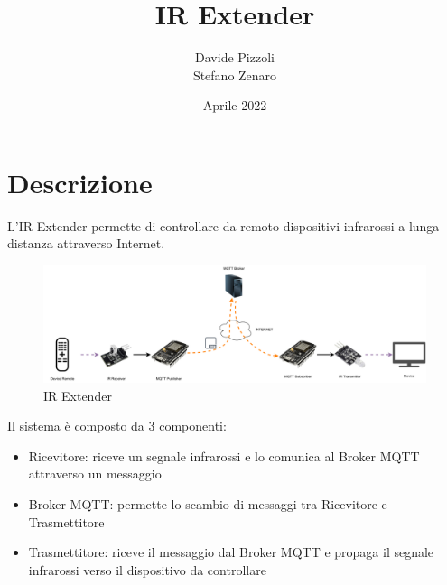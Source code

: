 \documentclass[a4paper,11pt]{article}
\begin{document}
\title{IR Extender}
\author{Davide Pizzoli \\ Stefano Zenaro}
\date{Aprile 2022}


\begin{titlepage}
  \maketitle
  \thispagestyle{empty}
\end{titlepage}

\tableofcontents
{}
\clearpage


\section{Descrizione}

    L'IR Extender permette di controllare da remoto dispositivi infrarossi a lunga distanza attraverso Internet.

    \begin{figure}[H]
      \centering
      \includegraphics[width=\textwidth,height=\textheight,keepaspectratio]{assets/ir_extender}
      \caption{IR Extender}
    \end{figure}

    Il sistema è composto da 3 componenti:
    \begin{itemize}
      \item Ricevitore: riceve un segnale infrarossi e lo comunica al Broker MQTT attraverso un messaggio
      \item Broker MQTT: permette lo scambio di messaggi tra Ricevitore e Trasmettitore
      \item Trasmettitore: riceve il messaggio dal Broker MQTT e propaga il segnale infrarossi verso il dispositivo da controllare
    \end{itemize}

\end{document}
